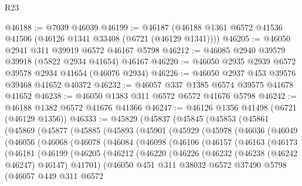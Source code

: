 \begin{lexlean}{R23}
\begin{coremodule}
@46188 := @7039 @46039
@46199 := @46187 (@46188 @1361 @6572 @41536 @41506 (@46126 @1341 @33408 (@6721 (@46129 @1341))))
@46205 := @46050 @2941 @311 @39919 @6572 @46167 @5798
@46212 := @46085 @2940 @39579 @39918 (@5822 @2934 @41654) @46167
@46220 := @46050 @2935 @2939 @6572 @39578 @2934 @41654 (@46076 @2934)
@46226 := @46050 @2937 @453 @39576 @39468 @41652 @40372
@46232 := @46057 @337 @1385 @6574 @39575 @41678 @41652
@46238 := @46050 @1383 @311 @6572 @6572 @41676 @5798
@46242 := @46188 @1382 @6572 @41676 @41366
@46247 := @46126 @1356 @41498 (@6721 (@46129 @1356))
@46333 := @45829
    (@45837
      (@45845
        (@45853
          (@45861
            (@45869
              (@45877
                (@45885
                  (@45893
                    (@45901
                      (@45929
                        (@45978
                          (@46036
                            (@46049
                              (@46056
                                (@46068
                                  (@46078
                                    (@46084
                                      (@46098
                                        (@46106
                                          (@46157
                                            (@46163
                                              (@46173
                                                (@46181
                                                  (@46199
                                                    (@46205
                                                      (@46212
                                                        (@46220
                                                          (@46226
                                                            (@46232
                                                              (@46238 (@46242 @46247) @46147)
                                                              @41701)
                                                            (@46050
                                                              @451
                                                              @311
                                                              @38032
                                                              @6572
                                                              @37490
                                                              @5798
                                                              (@46057
                                                                @449
                                                                @311
                                                                @6572

\end{coremodule}
\end{lexlean}
